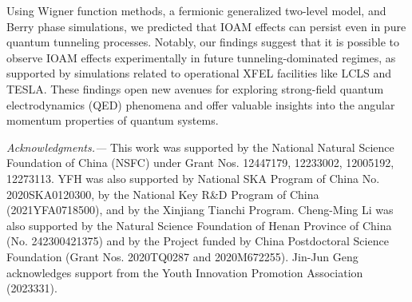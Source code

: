 \documentclass[prl,twocolumn,floatfix,amsmath,nofootinbib,superscriptaddress,amssymb,preprintnumbers,floatfix]{revtex4-1}
\begin{document}
Using Wigner function methods, a fermionic generalized two-level model, and Berry phase simulations, we predicted that IOAM effects can persist even in pure quantum tunneling processes. Notably, our findings suggest that it is possible to observe IOAM effects experimentally in future tunneling-dominated regimes, as supported by simulations related to operational XFEL facilities like LCLS and TESLA. These findings open new avenues for exploring strong-field quantum electrodynamics (QED) phenomena and offer valuable insights into the angular momentum properties of quantum systems.

\emph{Acknowledgments.---} This work was supported by the National
Natural Science Foundation of China (NSFC) under Grant Nos. 12447179, 12233002, 12005192, 12273113.  YFH was also supported by National
SKA Program of China No. 2020SKA0120300, by the National Key R\&D
Program of China (2021YFA0718500), and by the Xinjiang Tianchi
Program. Cheng-Ming Li was also supported by the Natural Science Foundation of Henan Province of China (No. 242300421375) and by the Project funded by China Postdoctoral Science Foundation (Grant Nos. 2020TQ0287 and 2020M672255). Jin-Jun Geng acknowledges support from the Youth Innovation Promotion Association (2023331).
\end{document}
